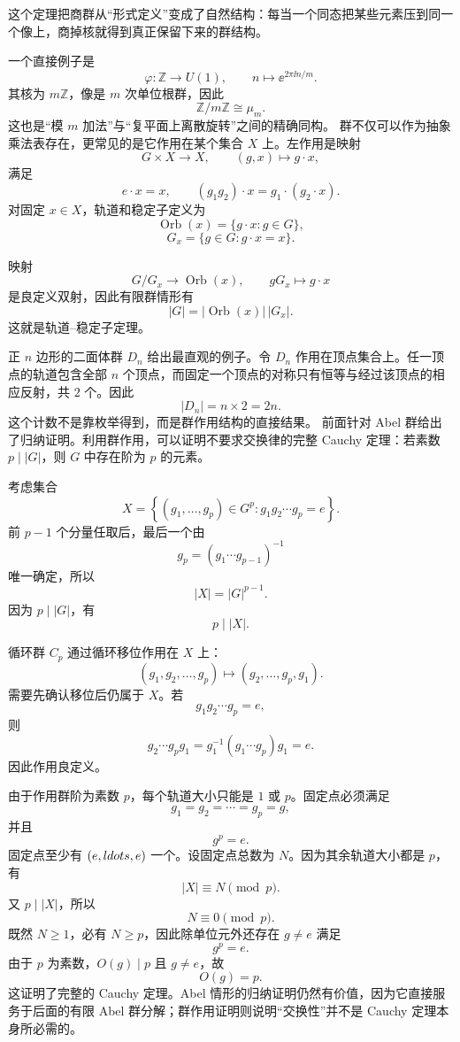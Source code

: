 这个定理把商群从“形式定义”变成了自然结构：每当一个同态把某些元素压到同一个像上，商掉核就得到真正保留下来的群结构。

一个直接例子是
\[
\varphi:\mathbb Z\to U(1),
\qquad
n\mapsto \ee^{2\pi\ii n/m}.
\]
其核为 $m\mathbb Z$，像是 $m$ 次单位根群，因此
\[
\mathbb Z/m\mathbb Z\cong \mu_m.
\]
这也是“模 $m$ 加法”与“复平面上离散旋转”之间的精确同构。
群不仅可以作为抽象乘法表存在，更常见的是它作用在某个集合 $X$ 上。左作用是映射
\[
G\times X\to X,
\qquad (g,x)\mapsto g\cdot x,
\]
满足
\[
e\cdot x=x,
\qquad
(g_1g_2)\cdot x=g_1\cdot(g_2\cdot x).
\]
对固定 $x\in X$，轨道和稳定子定义为
\[
\operatorname{Orb}(x)=\{g\cdot x:g\in G\},
\]
\[
G_x=\{g\in G:g\cdot x=x\}.
\]

映射
\[
G/G_x\to\operatorname{Orb}(x),
\qquad
gG_x\mapsto g\cdot x
\]
是良定义双射，因此有限群情形有
\begin{equation*}\boxed{
|G|=|\operatorname{Orb}(x)|\,|G_x|
}.\end{equation*}
这就是轨道--稳定子定理。

正 $n$ 边形的二面体群 $D_n$ 给出最直观的例子。令 $D_n$ 作用在顶点集合上。任一顶点的轨道包含全部 $n$ 个顶点，而固定一个顶点的对称只有恒等与经过该顶点的相应反射，共 $2$ 个。因此
\[
|D_n|=n\times2=2n.
\]
这个计数不是靠枚举得到，而是群作用结构的直接结果。
前面针对 Abel 群给出了归纳证明。利用群作用，可以证明不要求交换律的完整 Cauchy 定理：若素数 $p\mid|G|$，则 $G$ 中存在阶为 $p$ 的元素。

考虑集合
\[
X=\left\{(g_1,\ldots,g_p)\in G^p:
 g_1g_2\cdots g_p=e\right\}.
\]
前 $p-1$ 个分量任取后，最后一个由
\[
g_p=(g_1\cdots g_{p-1})^{-1}
\]
唯一确定，所以
\[
|X|=|G|^{p-1}.
\]
因为 $p\mid|G|$，有
\[
p\mid|X|.
\]

循环群 $C_p$ 通过循环移位作用在 $X$ 上：
\[
(g_1,g_2,\ldots,g_p)
\mapsto
(g_2,\ldots,g_p,g_1).
\]
需要先确认移位后仍属于 $X$。若
\[
g_1g_2\cdots g_p=e,
\]
则
\[
g_2\cdots g_pg_1
=g_1^{-1}(g_1\cdots g_p)g_1=e.
\]
因此作用良定义。

由于作用群阶为素数 $p$，每个轨道大小只能是 $1$ 或 $p$。固定点必须满足
\[
g_1=g_2=\cdots=g_p=g,
\]
并且
\[
g^p=e.
\]
固定点至少有 $(e,\\ldots,e)$ 一个。设固定点总数为 $N$。因为其余轨道大小都是 $p$，有
\[
|X|\equiv N\pmod p.
\]
又 $p\mid|X|$，所以
\[
N\equiv0\pmod p.
\]
既然 $N\ge1$，必有 $N\ge p$，因此除单位元外还存在 $g\neq e$ 满足
\[
g^p=e.
\]
由于 $p$ 为素数，$O(g)\mid p$ 且 $g\neq e$，故
\[
\boxed{O(g)=p}.
\]
这证明了完整的 Cauchy 定理。Abel 情形的归纳证明仍然有价值，因为它直接服务于后面的有限 Abel 群分解；群作用证明则说明“交换性”并不是 Cauchy 定理本身所必需的。


